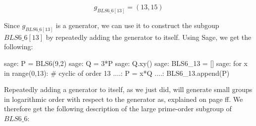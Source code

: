 \begin{equation}\label{gBLS6-6-13}
g_{BLS6\_6[13]} = (13,15)
\end{equation}

Since $g_{BLS6\_6[13]}$ is a generator, we can use it to construct the subgoup $BLS6\_6[13]$ by repeatedly adding the generator to itself. Using Sage, we get the following:
\begin{sagecommandline}
sage: P = BLS6(9,2)
sage: Q = 3*P
sage: Q.xy()
sage: BLS6_13 = []
sage: for x in range(0,13): # cyclic of order 13
....:     P = x*Q
....:     BLS6_13.append(P)
\end{sagecommandline}
Repeatedly adding a generator to itself, as we just did, will generate small groups in logarithmic order with respect to the generator as, explained on page \pageref{generators} ff. We therefore get the following description of the large prime-order subgroup of $BLS6\_6$:

